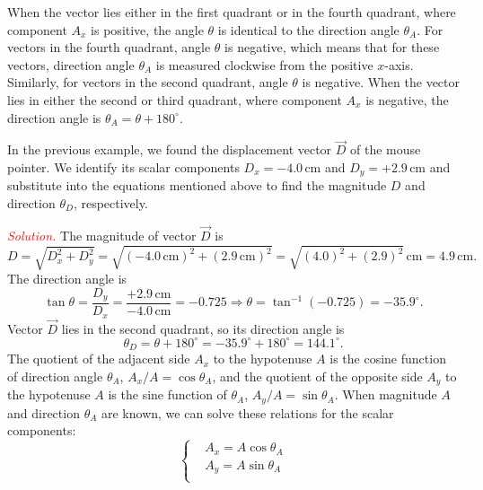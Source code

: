 \documentclass{report}
\begin{document}
    \pagebreak \bigbreak \noindent 
    When the vector lies either in the first quadrant or in the fourth quadrant, where component $A_x$ is positive, the angle $\theta$ is identical to the direction angle $\theta_A$. For vectors in the fourth quadrant, angle $\theta$ is negative, which means that for these vectors, direction angle $\theta_A$ is measured clockwise from the positive $x$-axis. Similarly, for vectors in the second quadrant, angle $\theta$ is negative. 
    \bigbreak \noindent 
    When the vector lies in either the second or third quadrant, where component $A_x$ is negative, the direction angle is $\theta_A = \theta + 180^\circ$.
    \bigbreak \noindent 
    \bigbreak \noindent 
    \begin{exm}
        In the previous example, we found the displacement vector $\vec{D}$ of the mouse pointer. We identify its scalar components $D_x = -4.0\, \text{cm}$ and $D_y = +2.9\, \text{cm}$ and substitute into the equations mentioned above to find the magnitude $D$ and direction $\theta_D$, respectively.
    \end{exm}
    \bigbreak \noindent 
    \textcolor{red}{\textit{Solution.}}
    The magnitude of vector $\vec{D}$ is
    \[
        D = \sqrt{D_x^2 + D_y^2} = \sqrt{(-4.0\, \text{cm})^2 + (2.9\, \text{cm})^2} = \sqrt{(4.0)^2 + (2.9)^2}\, \text{cm} = 4.9\, \text{cm}.
    \]
    The direction angle is
    \[
        \tan \theta = \frac{D_y}{D_x} = \frac{+2.9\, \text{cm}}{-4.0\, \text{cm}} = -0.725 \Rightarrow \theta = \tan^{-1}(-0.725) = -35.9^\circ.
    \]
    Vector $\vec{D}$ lies in the second quadrant, so its direction angle is
    \[
        \theta_D = \theta + 180^\circ = -35.9^\circ + 180^\circ = 144.1^\circ.
    \]
    \bigbreak \noindent 
    The quotient of the adjacent side $A_x$ to the hypotenuse $A$ is the cosine function of direction angle $\theta_A$, $A_x/A = \cos \theta_A$, and the quotient of the opposite side $A_y$ to the hypotenuse $A$ is the sine function of $\theta_A$, $A_y/A = \sin \theta_A$. When magnitude $A$ and direction $\theta_A$ are known, we can solve these relations for the scalar components:
       \begin{equation}
            \begin{cases}
                &A_{x} = A\cos{\theta_{A}} \\
                &A_{y} = A\sin{\theta_{A}} \\
            \end{cases}
        \end{equation}
\end{document}
